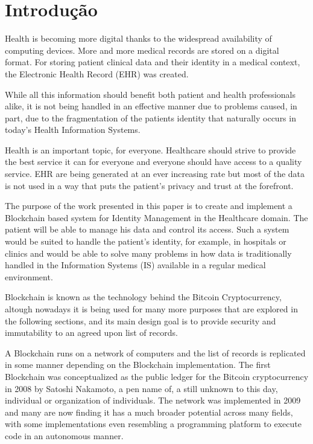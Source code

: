 \chapter{Introdução}

Health is becoming more digital thanks to the widespread availability of
computing devices.  More and more medical records are stored on a digital
format.  For storing patient clinical data and their identity in a medical
context, the Electronic Health Record (EHR) was created.
 
While all this information should benefit both patient and health professionals
alike, it is not being handled in an effective manner due to problems caused,
in part, due to the fragmentation of the patients identity that naturally
occurs in today's Health Information Systems.

Health is an important topic, for everyone. Healthcare should strive to provide
the best service it can for everyone and everyone should have access to a
quality service. EHR are being generated at an ever increasing rate but most of
the data is not used in a way that puts the patient's privacy and trust at the
forefront.

The purpose of the work presented in this paper is to create and implement a
Blockchain based system for Identity Management in the Healthcare domain. The
patient will be able to manage his data and control its access. Such a system
would be suited to handle the patient’s identity, for example, in hospitals or
clinics and would be able to solve many problems in how data is traditionally
handled in the Information Systems (IS) available in a regular medical
environment.

Blockchain is known as the technology behind the Bitcoin Cryptocurrency,
altough nowadays it is being used for many more purposes that are explored in
the following sections, and its main design goal is to provide security and
immutability to an agreed upon list of records.

A Blockchain runs on a network of computers and the list of records is
replicated in some manner depending on the Blockchain implementation. The first
Blockchain was conceptualized as the public ledger for the Bitcoin
cryptocurrency in 2008 by Satoshi Nakamoto, a pen name of, a still unknown to
this day, individual or organization of individuals.  The network was
implemented in 2009 and many are now finding it has a much broader potential
across many fields, with some implementations even resembling a programming
platform to execute code in an autonomous manner.  \cite{Nakamoto2008}


